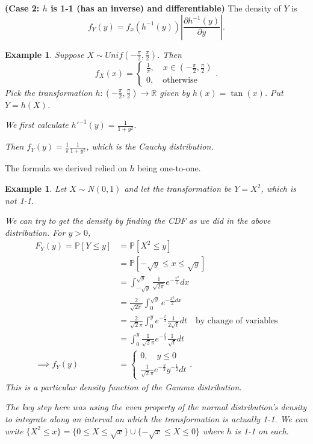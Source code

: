 \documentclass{tufte-handout}
\newcommand*\R{\mathbb{R}}
\renewcommand{\P}{\mathbb{P}}
\newtheorem{ex}[thm]{Example}
\theoremstyle{definition}
\begin{document}
\textbf{(Case 2: $h$ is 1-1 (has an inverse) and differentiable)} The density of $Y$ is \[	f_Y(y) = f_x(h^{-1}(y)) \left| \frac{\partial h^{-1}(y)}{\partial y} \right|.\]

\begin{ex}
	Suppose $X \sim Unif(-\frac{\pi}{2}, \frac{\pi}{2})$. Then \[
		f_X(x) = \begin{cases}
			\frac{1}{\pi}, \quad x \in (-\frac{\pi}{2},\frac{\pi}{2}) \\
			0, \quad \text{otherwise}
		\end{cases}
	.\] Pick the transformation $h: (-\frac{\pi}{2}, \frac{\pi}{2}) \to \R$ given by $h(x) = \tan(x)$.
	Put $Y = h(X)$.

	We first calculate $h'^{-1}(y) = \frac{1}{1+y^2}.$

	Then $f_Y(y) = \frac{1}{\pi} \frac{1}{1 + y^2}$, which is the Cauchy distribution.
\end{ex}

The formula we derived relied on $h$ being one-to-one.

\begin{ex}
	Let $X \sim N(0,1)$ and let the transformation be $Y = X^2$, which is not 1-1. 

	We can try to get the density by finding the CDF as we did in the above distribution. For $y > 0$,
	\begin{align*}
		F_Y(y) = \P\left[Y \le y\right] &= \P\left[X^2 \le y\right]  \\
		&= \P\left[-\sqrt{y} \le x \le \sqrt{y} \right]  \\
		&= \int_{-\sqrt{y}}^{\sqrt{y} } \frac{1}{\sqrt{2\pi}} e^{-\frac{x^2}{2}}dx  \\
		&= \frac{2}{\sqrt{2\pi} } \int_{0}^{\sqrt{y} } e^{-\frac{x^2}{2} dx}   \\
		&= \frac{2}{\sqrt{2} \pi} \int_{0}^{y} e^{-\frac{t}{2}} \frac{1}{2 \sqrt{t} }dt \quad \text{by change of variables}  \\
		&= \int_{0}^{y}  \frac{1}{\sqrt{2} \pi} e^{-\frac{t}{2}} \frac{1}{\sqrt{t} }dt \\
		\implies f_Y(y) &= \begin{cases}
			0, \quad y \le 0 \\
			\frac{1}{\sqrt{2} \pi} e^{-\frac{y}{2}} y^{-\frac{1}{2}} dt
		\end{cases}
	.\end{align*}
	This is a particular density function of the Gamma distribution.

	The key step here was using the even property of the normal distribution's density to integrate along an interval on which the transformation is actually 1-1. We can write $\{X^2 \le x\} = \{ 0 \le X \le \sqrt{x} \} \cup  \{-\sqrt{x} \le X \le 0\}$ where $h$ is 1-1 on each.
\end{ex}
\end{document}
